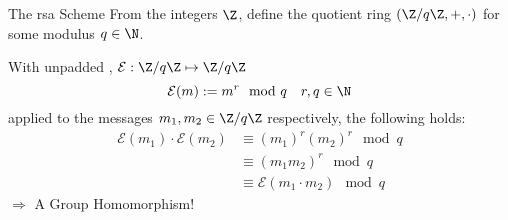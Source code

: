 \begin{frame}{The \gls{rsa} Scheme}
  From the integers $\Z$, define the quotient ring $(\Z/q\Z, +, \cdot)$ for some modulus $q \in \N$.

  With unpadded  \parencite{1983-rsa}, $\mathcal{E}: \Z/q\Z \mapsto \Z/q\Z$
  $$\mathcal{E}(m) := m^r \mod q \quad r, q \in \N$$
  applied to the messages $m_1, m_2 \in \Z/q\Z$ respectively, the following holds:
  \begin{align*}
    \mathcal{E}(m_1) \cdot \mathcal{E}(m_2)
     & \equiv (m_1)^r (m_2)^r \mod q            \\
     & \equiv (m_1 m_2)^r \mod q                \\
     & \equiv \mathcal{E}(m_1 \cdot m_2) \mod q
  \end{align*}
  $\Rightarrow$ A Group Homomorphism!
\end{frame}
